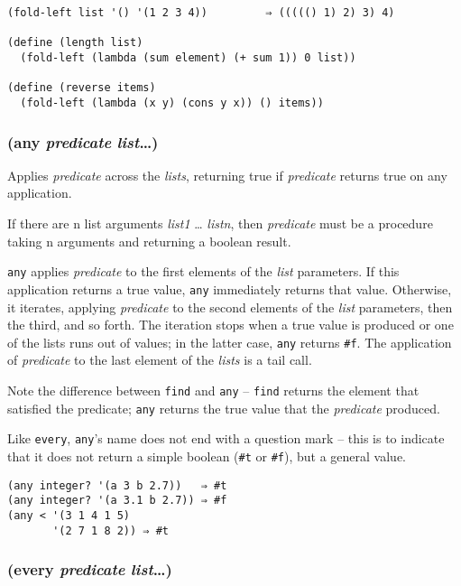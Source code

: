 \documentclass{article}
\begin{document}
\begin{verbatim}
(fold-left list '() '(1 2 3 4))         ⇒ ((((() 1) 2) 3) 4)

(define (length list)
  (fold-left (lambda (sum element) (+ sum 1)) 0 list))

(define (reverse items)
  (fold-left (lambda (x y) (cons y x)) () items))
\end{verbatim}

\subsubsection{(any \emph{predicate} \emph{list}\ldots{})}

Applies \emph{predicate} across the \emph{lists}, returning true if \emph{predicate} returns
true on any application.

If there are n list arguments \emph{list1} \ldots{} \emph{listn}, then \emph{predicate} must
be a procedure taking n arguments and returning a boolean result.

\verb|any| applies \emph{predicate} to the first elements of the \emph{list} parameters. If
this application returns a true value, \verb|any| immediately returns that value. Otherwise,
it iterates, applying \emph{predicate} to the second elements of the \emph{list} parameters,
then the third, and so forth. The iteration stops when a true value is produced or one of the
lists runs out of values; in the latter case, \verb|any| returns \verb|#f|. The
application of \emph{predicate} to the last element of the \emph{lists} is a tail call.

Note the difference between \verb|find| and \verb|any| -- \verb|find| returns the
element that satisfied the predicate; \verb|any| returns the true value that the
\emph{predicate} produced.

Like \verb|every|, \verb|any|'s name does not end with a question mark -- this is to
indicate that it does not return a simple boolean (\verb|#t| or \verb|#f|), but a
general value.

\begin{verbatim}
(any integer? '(a 3 b 2.7))   ⇒ #t
(any integer? '(a 3.1 b 2.7)) ⇒ #f
(any < '(3 1 4 1 5)
       '(2 7 1 8 2)) ⇒ #t
\end{verbatim}

\subsubsection{(every \emph{predicate} \emph{list}\ldots{})}
\end{document}
